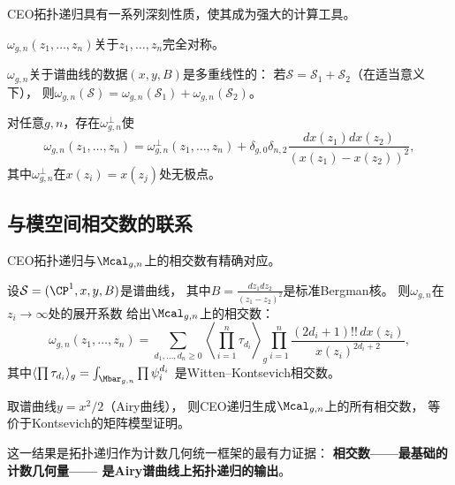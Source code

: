 CEO拓扑递归具有一系列深刻性质，使其成为强大的计算工具。

\begin{theorem}[对称性]\label{thm:sym}
$\omega_{g,n}(z_1, \ldots, z_n)$关于$z_1, \ldots, z_n$完全对称。
\end{theorem}

\begin{theorem}[线性化]\label{thm:lin}
$\omega_{g,n}$关于谱曲线的数据$(x, y, B)$是多重线性的：
若$\mathcal{S} = \mathcal{S}_1 + \mathcal{S}_2$（在适当意义下），
则$\omega_{g,n}(\mathcal{S}) = \omega_{g,n}(\mathcal{S}_1) + \omega_{g,n}(\mathcal{S}_2)$。
\end{theorem}

\begin{theorem}[投影性质]\label{thm:proj}
对任意$g, n$，存在$\omega_{g,n}^\perp$使
\[
\omega_{g,n}(z_1, \ldots, z_n) = \omega_{g,n}^\perp(z_1, \ldots, z_n)
+ \delta_{g,0}\delta_{n,2} \frac{dx(z_1) dx(z_2)}{(x(z_1) - x(z_2))^2},
\]
其中$\omega_{g,n}^\perp$在$x(z_i) = x(z_j)$处无极点。
\end{theorem}

\subsection{与模空间相交数的联系}

CEO拓扑递归与$\Mcal_{g,n}$上的相交数有精确对应。

\begin{theorem}\label{thm:EOcorrespond}
设$\mathcal{S} = (\CP^1, x, y, B)$是谱曲线，
其中$B = \frac{dz_1 dz_2}{(z_1-z_2)^2}$是标准Bergman核。
则$\omega_{g,n}$在$z_i \to \infty$处的展开系数
给出$\Mcal_{g,n}$上的相交数：
\[
\omega_{g,n}(z_1, \ldots, z_n)
= \sum_{d_1, \ldots, d_n \geq 0}
\left\langle \prod_{i=1}^n \tau_{d_i} \right\rangle_g
\prod_{i=1}^n \frac{(2d_i+1)!! \, dx(z_i)}{x(z_i)^{2d_i+2}},
\]
其中$\langle \prod \tau_{d_i} \rangle_g = \int_{\Mbar_{g,n}} \prod \psi_i^{d_i}$
是Witten--Kontsevich相交数。
\end{theorem}

\begin{corollary}\label{cor:WK}
取谱曲线$y = x^2/2$（Airy曲线），
则CEO递归生成$\Mcal_{g,n}$上的所有相交数，
等价于Kontsevich的矩阵模型证明。
\end{corollary}

这一结果是拓扑递归作为计数几何统一框架的最有力证据：
\textbf{相交数——最基础的计数几何量——
是Airy谱曲线上拓扑递归的输出}。

